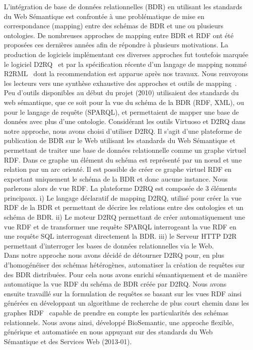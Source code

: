 L'intégration de base de données relationnelles (BDR) en utilisant les standards du Web Sémantique est confrontée à une problématique de mise en correspondance (mapping) entre des schémas de BDR et une ou plusieurs ontologies. De nombreuses approches de mapping entre BDR et RDF ont été proposées ces dernières années afin de répondre à plusieurs motivations. La production de logiciels implémentant ces diverses approches fut toutefois marquée le logiciel D2RQ~\cite{Bizer2003,Bizer2004} et par la spécification récente d’un langage de mapping nommé R2RML~\cite{Souripriya} dont la recommendation est apparue après nos travaux. Nous renvoyons les lecteurs vers une synthèse exhaustive des approches et outils de mapping~\cite{Antipolis2014}.\\

Peu d’outils disponibles au début du projet (2010) utilisaient des standards du web sémantique, que ce soit pour la vue du schéma de la BDR (RDF, XML), ou pour le langage de requête (SPARQL), et permettaient de mapper une base de données avec plus d’une ontologie. Considérant les outils Virtuoso et D2RQ dans notre approche, nous avons choisi d'utiliser D2RQ. Il s'agit d'une plateforme de publication de BDR sur le Web utilisant les standards du Web Sémantique et permettant de traiter une base de données relationnelle comme un graphe virtuel RDF. Dans ce graphe un élément du schéma est représenté par un nœud et une relation par un arc orienté. Il est possible de créer ce graphe virtuel RDF en exportant uniquement le schéma de la BDR et donc aucune instance. Nous parlerons alors de vue RDF. La plateforme D2RQ est composée de 3 éléments principaux. i) Le langage déclaratif de mapping D2RQ, utilisé pour créer la vue RDF de la BDR et permettant de décrire les relations entre des ontologies et un schéma de BDR. ii) Le moteur D2RQ permettant de créer automatiquement une vue RDF et de transformer une requête SPARQL interrogeant la vue RDF en une requête SQL interrogeant directement la BDR. iii) le Serveur HTTP D2R permettant d’interroger les bases de données relationnelles via le Web.\\

Dans notre approche nous avons décidé de détourner D2RQ pour, en plus d'homogénéiser des schémas hétérogènes, automatiser la création de requêtes sur des BDR distribuées. Pour cela nous avons enrichi sémantiquement et de manière automatique la vue RDF du schéma de BDR créée par D2RQ. Nous avons ensuite travaillé sur la formulation de requêtes se basant sur les vues RDF ainsi générées en développant un algorithme de recherche de plus court chemin dans les graphes RDF~\cite{wollbrett2013clever} capable de prendre en compte les particularités des schémas relationnels. Nous avons ainsi, développé BioSemantic, une approche flexible, générique et automatisée en nous appuyant sur des standards du Web Sémantique et des Services Web (2013-01). \\

